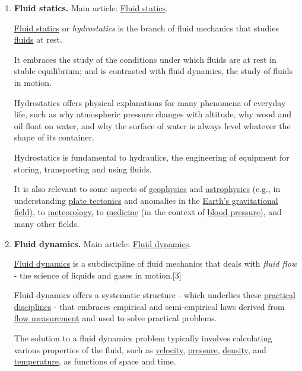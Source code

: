 \documentclass{article}
\begin{document}
\begin{enumerate}
	\item {\bf Fluid statics.} Main article: \href{https://en.wikipedia.org/wiki/Fluid_statics}{Fluid statics}.
	
	\href{https://en.wikipedia.org/wiki/Fluid_statics}{Fluid statics} or \textit{hydrostatics} is the branch of fluid mechanics that studies \href{https://en.wikipedia.org/wiki/Fluid}{fluids} at rest.
	
	It embraces the study of the conditions under which fluids are at rest in stable equilibrium; and is contrasted with fluid dynamics, the study of fluids in motion.
	
	Hydrostatics offers physical explanations for many phenomena of everyday life, such as why atmospheric pressure changes with altitude, why wood and oil float on water, and why the surface of water is always level whatever the shape of its container.
	
	Hydrostatics is fundamental to hydraulics, the engineering of equipment for storing, transporting and using fluids.
	
	It is also relevant to some aspects of \href{https://en.wikipedia.org/wiki/Geophysics}{geophysics} and \href{https://en.wikipedia.org/wiki/Astrophysics}{astrophysics} (e.g., in understanding \href{https://en.wikipedia.org/wiki/Plate_tectonics}{plate tectonics} and anomalies in the \href{https://en.wikipedia.org/wiki/Gravity_of_Earth}{Earth's gravitational field}), to \href{https://en.wikipedia.org/wiki/Meteorology}{meteorology}, to \href{https://en.wikipedia.org/wiki/Medicine}{medicine} (in the context of \href{https://en.wikipedia.org/wiki/Blood_pressure}{blood pressure}), and many other fields.
	\item {\bf Fluid dynamics.} Main article: \href{https://en.wikipedia.org/wiki/Fluid_dynamics}{Fluid dynamics}.
	
	\href{https://en.wikipedia.org/wiki/Fluid_dynamics}{Fluid dynamics} is a subdiscipline of fluid mechanics that deals with \textit{fluid flow} - the science of liquids and gases in motion.[3]
	
	Fluid dynamics offers a systematic structure - which underlies these \href{https://en.wikipedia.org/wiki/Practical_disciplines}{practical disciplines} - that embraces empirical and semi-empirical laws derived from \href{https://en.wikipedia.org/wiki/Flow_measurement}{flow measurement} and used to solve practical problems.
	
	The solution to a fluid dynamics problem typically involves calculating various properties of the fluid, such as \href{https://en.wikipedia.org/wiki/Velocity}{velocity}, \href{https://en.wikipedia.org/wiki/Pressure}{pressure}, \href{https://en.wikipedia.org/wiki/Density}{density}, and \href{https://en.wikipedia.org/wiki/Temperature}{temperature}, as functions of space and time.
	

\end{enumerate}
\end{document}
